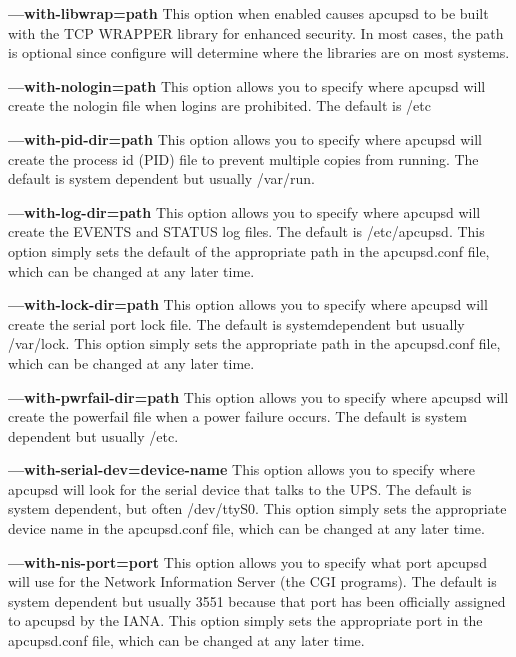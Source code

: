 \begin{description}
\item {\bf {---}with-libwrap=\lt{}path\gt{}}
This option when enabled causes apcupsd to be built with the TCP WRAPPER
library for enhanced security. In most cases, the \lt{}path\gt{} is optional
since configure will determine where the libraries are on most systems.  

\item {\bf {---}with-nologin=\lt{}path\gt{}}
This option allows you to specify where apcupsd will create the nologin file
when logins are prohibited. The default is /etc  

\item {\bf {---}with-pid-dir=\lt{}path\gt{}}
This option allows you to specify where apcupsd will create the process id
(PID) file to prevent multiple copies from running. The default is system
dependent but usually /var/run.  

\item {\bf {---}with-log-dir=\lt{}path\gt{}}
This option allows you to specify where apcupsd will create the EVENTS and
STATUS log files. The default is /etc/apcupsd. This option simply sets the
default of the appropriate path in the apcupsd.conf file, which can be changed
at any later time.  

\item {\bf {---}with-lock-dir=\lt{}path\gt{}}
This option allows you to specify where apcupsd will create the serial port
lock file. The default is systemdependent but usually /var/lock. This option
simply sets the appropriate path in the apcupsd.conf file, which can be
changed at any later time.  

\item {\bf {---}with-pwrfail-dir=\lt{}path\gt{}}
This option allows you to specify where apcupsd will create the powerfail file
when a power failure occurs. The default is system dependent but usually /etc.
 

\item {\bf {---}with-serial-dev=\lt{}device-name\gt{}}
This option allows you to specify where apcupsd will look for the serial
device that talks to the UPS. The default is system dependent, but often
/dev/ttyS0. This option simply sets the appropriate device name in the
apcupsd.conf file, which can be changed at any later time.  

\item {\bf {---}with-nis-port=\lt{}port\gt{}}
This option allows you to specify what port apcupsd will use for the Network
Information Server (the CGI programs). The default is system dependent but
usually 3551 because that port has been officially assigned to apcupsd by the
IANA. This option simply sets the appropriate port in the apcupsd.conf file,
which can be changed at any later time.  


\end{description}

